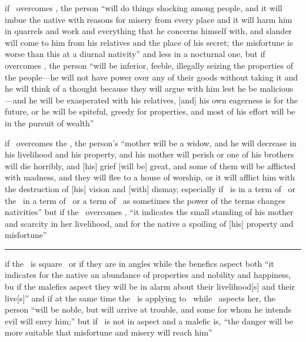\begin{description}[style=multiline,leftmargin=1.5cm]
\item[\Mars\Square\Mercury] if \Mars\, overcomes \Mercury, the person ``will do things shocking among people, and it will imbue the native with reasons for misery from every place and it will harm him in quarrels and work and everything that he concerns himself with, and slander will come to him from his relatives and the place of his secret; the misfortune is worse than this at a diurnal nativity'' and less in a nocturnal one, but if \Mercury\, overcomes \Mars, the person ``will be inferior, feeble, illegally seizing the properties of the people---he will not have power over any of their goods without taking it and he will think of a thought because they will argue with him lest he be malicious---and he will be exasperated with his relatives, [and] his own eagerness is for the future, or he will be spiteful, greedy for properties, and most of his effort will be in the pursuit of wealth''

\item[\Mars\Square\Moon] if \Mars\, overcomes the \Moon, the person's ``mother will be a widow, and he will decrease in his livelihood and his property, and his mother will perish or one of his brothers will die horribly, and [his] grief [will be] great, and some of them will be afflicted with madness, and they will flee to a house of worship, or it will afflict him with the destruction of [his] vision and [with] dismay, especially if \Mars\, is in a term of \Saturn\, or the \Moon\, in a term of \Mercury\, or a term of \Mars\, as sometimes the power of the terms changes nativities'' but if the \Moon\, overcomes \Mars, ``it indicates the small standing of his mother and scarcity in her livelihood, and for the native a spoiling of [his] property and misfortune''

\vspace{0.5em}\hrule
\item[\Sun\Square\Moon] if the \Sun\, is square \Moon\, or if they are in angles while the benefics aspect both ``it indicates for the native an abundance of properties and nobility and happiness, bu if the malefics aspect they will be in alarm about their livelihood[s] and their live[s]'' and if at the same time the \Moon\, is applying to \Jupiter\, while \Jupiter\, aspects her, the person ``will be noble, but will arrive at trouble, and some for whom he intends evil will envy him;'' but if \Jupiter\, is not in aspect and a malefic is, ``the danger will be more suitable that misfortune and misery will reach 
him''


\end{description}
